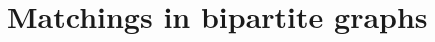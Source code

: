\documentclass[main]{subfiles}
\begin{document}

\section{Matchings in bipartite graphs}
\end{document}
